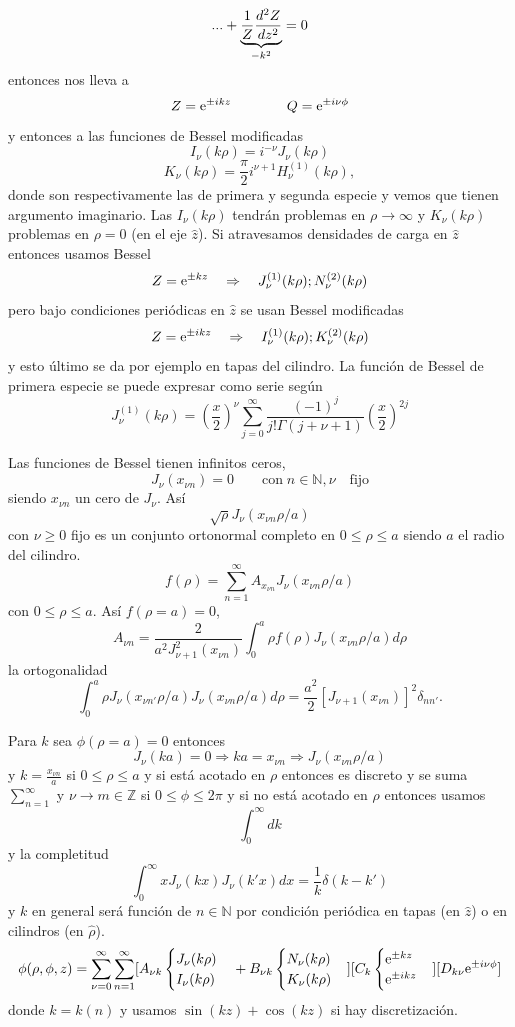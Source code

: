 \documentclass[10pt,oneside]{CBFT_book}
\begin{document}
\[
	... + \underbrace{\frac{1}{Z} \dtot[2]{Z}{z}}_{-k^2} =  0
\]
entonces nos lleva a
\[
	Z = \euler^{\pm i k z} \qquad \qquad Q = \euler^{\pm i \nu \phi}
\]
y entonces a las funciones de Bessel modificadas
\[
	I_\nu(k\rho) = i^{-\nu} J_\nu(k\rho)
\]
\[
	K_\nu(k\rho) = \frac{\pi}{2}i^{\nu+1} H_\nu^{(1)}(k\rho),
\]
donde son respectivamente las de primera y segunda especie y vemos que tienen argumento imaginario.
Las $I_\nu(k\rho)$ tendrán problemas en $\rho\to\infty$ y $K_\nu(k\rho)$ problemas en $\rho=0$ (en el eje 
$\hat{z}$).
Si atravesamos densidades de carga en $\hat{z}$ entonces usamos Bessel
\[
	Z = \euler^{\pm k z} \quad \Rightarrow \quad J_\nu^{(1)}(k\rho) ; N_\nu^{(2)}(k\rho)
\]
pero bajo condiciones periódicas en $\hat{z}$ se usan Bessel modificadas
\[
	Z = \euler^{ \pm i k z} \quad \Rightarrow \quad I_\nu^{(1)}(k\rho) ; K_\nu^{(2)}(k\rho)
\]
y esto último se da por ejemplo en tapas del cilindro.
La función de Bessel de primera especie se puede expresar como serie según
\[
	J_\nu^{(1)}(k\rho) = \left(\frac{x}{2}\right)^\nu \sum_{j=0}^\infty \frac{(-1)^j}{j!\Gamma(j+\nu +1)} 
		\left(\frac{x}{2}\right)^{2j}
\]

Las funciones de Bessel tienen infinitos ceros,
\[
	J_\nu(x_{\nu n}) = 0 \qquad \mathrm{con} \; n\in\mathbb{N}, \nu \quad \mathrm{fijo} 
\]
siendo $x_{\nu n}$ un cero de $J_\nu$. Así
\[
	\sqrt{\rho} J_\nu(x_{\nu n} \rho/a) 
\]
con $\nu \geq 0$ fijo es un conjunto ortonormal completo en $0 \leq \rho \leq a$ siendo $a$ el radio del 
cilindro.
\[
	f(\rho) = \sum_{n=1}^{\infty}  A_{x_{\nu n}} J_{\nu}( x_{\nu n} \rho/a )
\]
con $0 \leq \rho \leq a$. Así $f(\rho=a)=0$,
\[
	A_{\nu n} = \frac{2}{a^2 J_{\nu +1}^2 (x_{\nu n})} \int_0^a \rho f(\rho) J_\nu (x_{\nu n} \rho/a) 
	d\rho
\]
la ortogonalidad
\[
	\int_0^a \rho  J_\nu (x_{\nu n'} \rho/a)  J_\nu (x_{\nu n} \rho/a)  d\rho = 
	\frac{a^2}{2}[J_{\nu+1}(x_{\nu n})]^2 \delta_{nn'}.
\]

Para $k$ sea $\phi(\rho=a)=0$ entonces 
\[
	J_\nu(ka) = 0 \Rightarrow ka=x_{\nu n} \Rightarrow J_\nu (x_{\nu n} \rho/a)
\]
y $k=\frac{x_{\nu n}}{a}$ si $0\leq \rho \leq a$ y si está acotado en $\rho$ entonces es discreto y se
suma $\sum_{n=1}^\infty$ y $\nu\to m \in \mathbb{Z}$ si $0 \leq \phi \leq 2\pi$ y si no está acotado en
$\rho$ entonces usamos 
\[
	\int_0^\infty dk
\]
y la completitud
\[
	\int_0^\infty x J_\nu(kx) J_\nu(k'x) dx = \frac{1}{k} \delta (k-k')
\]
y $k$ en general será función de $n\in \mathbb{N}$ por condición periódica en tapas (en $\hat{z}$) o en
cilindros (en $\hat{\rho}$).
\[
	\phi(\rho,\phi,z) = \sum_{\nu=0}^\infty \sum_{n=1}^\infty
	[A_{\nu k}\begin{cases} J_\nu(k\rho)  \\ I_\nu(k\rho) \end{cases} + 
	B_{\nu k} \begin{cases} N_\nu(k\rho)  \\ K_\nu(k\rho) \end{cases} ]
	[C_k \begin{cases} \euler^{\pm kz} \\ \euler^{\pm ikz} \end{cases}]
	[D_{k\nu} \euler^{\pm i \nu \phi}]
\]
donde $k=k(n)$ y usamos $\sin(kz)+\cos(kz)$ si hay discretización.



\end{document}
